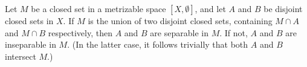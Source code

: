 Let $M$ be a closed set in a metrizable space $[X, \emptyset]$, and let $A$ and $B$ be disjoint closed sets in $X$. If $M$ is the union of two disjoint closed sets, containing $M \cap A$ and $M \cap B$ respectively, then $A$ and $B$ are separable in $M$. If not, $A$ and $B$ are inseparable in $M$. (In the latter case, it follows trivially that both $A$ and $B$ intersect $M$.)
